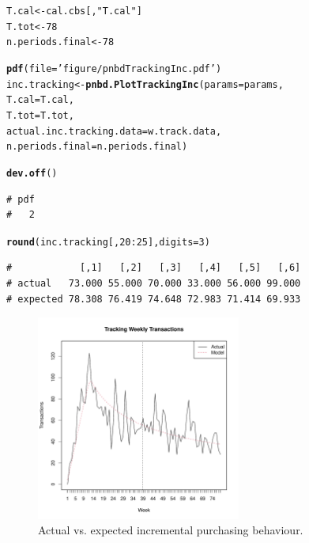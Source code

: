 \documentclass[10pt, letterpaper, onecolumn, oneside, final]{article}\usepackage[]{graphicx}\usepackage[]{color}
\makeatletter
\newcommand{\hlnum}[1]{\textcolor[rgb]{0.686,0.059,0.569}{#1}}%
\newcommand{\hlstr}[1]{\textcolor[rgb]{0.192,0.494,0.8}{#1}}%
\newcommand{\hlopt}[1]{\textcolor[rgb]{0,0,0}{#1}}%
\newcommand{\hlstd}[1]{\textcolor[rgb]{0.345,0.345,0.345}{#1}}%
\newcommand{\hlkwb}[1]{\textcolor[rgb]{0.69,0.353,0.396}{#1}}%
\newcommand{\hlkwc}[1]{\textcolor[rgb]{0.333,0.667,0.333}{#1}}%
\newcommand{\hlkwd}[1]{\textcolor[rgb]{0.737,0.353,0.396}{\textbf{#1}}}%
\newenvironment{kframe}{%
 \def\at@end@of@kframe{}%
 \ifinner\ifhmode%
  \def\at@end@of@kframe{\end{minipage}}%
  \begin{minipage}{\columnwidth}%
 \fi\fi%
 \def\FrameCommand##1{\hskip\@totalleftmargin \hskip-\fboxsep
 \colorbox{shadecolor}{##1}\hskip-\fboxsep
     \hskip-\linewidth \hskip-\@totalleftmargin \hskip\columnwidth}%
 \MakeFramed {\advance\hsize-\width
   \@totalleftmargin\z@ \linewidth\hsize
   \@setminipage}}%
 {\par\unskip\endMakeFramed%
 \at@end@of@kframe}
\newenvironment{knitrout}{}{} %
\makeatother
\begin{document}
\begin{knitrout}
\color{fgcolor}\begin{kframe}
\begin{alltt}
\hlstd{T.cal} \hlkwb{<-} \hlstd{cal.cbs[,}\hlstr{"T.cal"}\hlstd{]}
\hlstd{T.tot} \hlkwb{<-} \hlnum{78}
\hlstd{n.periods.final} \hlkwb{<-} \hlnum{78}

\hlkwd{pdf}\hlstd{(}\hlkwc{file} \hlstd{=} \hlstr{'figure/pnbdTrackingInc.pdf'}\hlstd{)}
\hlstd{inc.tracking} \hlkwb{<-} \hlkwd{pnbd.PlotTrackingInc}\hlstd{(}\hlkwc{params} \hlstd{= params,}
                                     \hlkwc{T.cal} \hlstd{= T.cal,}
                                     \hlkwc{T.tot} \hlstd{= T.tot,}
                                     \hlkwc{actual.inc.tracking.data} \hlstd{= w.track.data,}
                                     \hlkwc{n.periods.final} \hlstd{= n.periods.final)}
\end{alltt}


{\ttfamily\noindent\color{warningcolor}{\# Warning in FUN(X[[i]], ...): Maximum vector length not a multiple of the length of actual.inc.tracking.data}}\begin{alltt}
\hlkwd{dev.off}\hlstd{()}
\end{alltt}
\begin{verbatim}
# pdf 
#   2
\end{verbatim}
\begin{alltt}
\hlkwd{round}\hlstd{(inc.tracking[,}\hlnum{20}\hlopt{:}\hlnum{25}\hlstd{],} \hlkwc{digits} \hlstd{=} \hlnum{3}\hlstd{)}
\end{alltt}
\begin{verbatim}
#            [,1]   [,2]   [,3]   [,4]   [,5]   [,6]
# actual   73.000 55.000 70.000 33.000 56.000 99.000
# expected 78.308 76.419 74.648 72.983 71.414 69.933
\end{verbatim}
\end{kframe}
\end{knitrout}

\begin{figure}
  \begin{center}
  \includegraphics[width=0.6\textwidth]{figure/pnbdTrackingInc}
  \caption{Actual vs. expected incremental purchasing behaviour.}\label{fig:pnbdTrackingInc}
  \end{center}
\end{figure}
\end{document}

